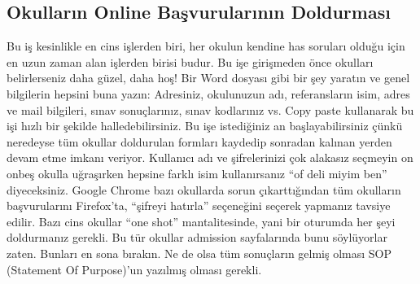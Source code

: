 \documentclass[12pt]{article}
\theoremstyle{break}
\begin{document}
\subsection{Okulların Online Başvurularının Doldurması}
Bu iş kesinlikle en cins işlerden biri, her okulun kendine has soruları olduğu için en uzun zaman alan işlerden birisi budur. Bu işe girişmeden önce okulları belirlerseniz daha güzel, daha hoş! Bir Word dosyası gibi bir şey yaratın ve genel bilgilerin hepsini buna yazın: Adresiniz, okulunuzun adı, referansların isim, adres ve mail bilgileri, sınav sonuçlarınız, sınav kodlarınız vs. Copy paste kullanarak bu işi hızlı bir şekilde halledebilirsiniz. Bu işe istediğiniz an başlayabilirsiniz çünkü neredeyse tüm okullar doldurulan formları kaydedip sonradan kalınan yerden devam etme imkanı veriyor. Kullanıcı adı ve şifrelerinizi çok alakasız seçmeyin on onbeş okulla uğraşırken hepsine farklı isim kullanırsanız “of deli miyim ben” diyeceksiniz. Google Chrome bazı okullarda sorun çıkarttığından tüm okulların başvurularını Firefox’ta, “şifreyi hatırla” seçeneğini seçerek yapmanız tavsiye edilir. Bazı cins okullar “one shot” mantalitesinde, yani bir oturumda her şeyi doldurmanız gerekli. Bu tür okullar admission sayfalarında bunu söylüyorlar zaten. Bunları en sona bırakın. Ne de olsa tüm sonuçların gelmiş olması SOP (Statement Of Purpose)’un yazılmış olması gerekli.
\end{document}
